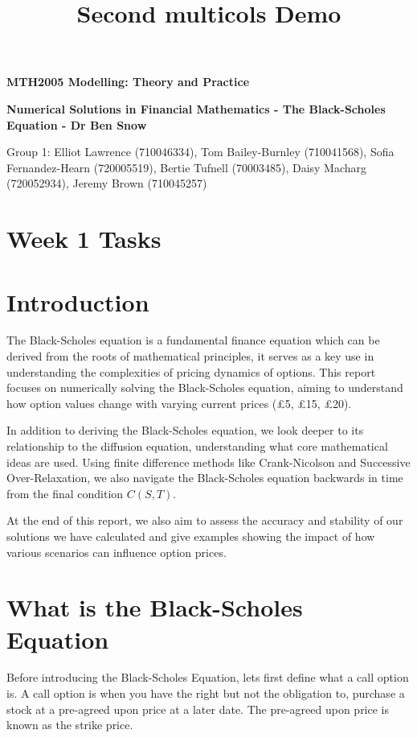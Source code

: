 \documentclass[11pt]{article}
\title{Second multicols Demo}
\begin{document}
{\large\bf MTH2005 Modelling: Theory and Practice }
 
\vspace{4mm} 

{\Large\bf Numerical Solutions in Financial Mathematics - The Black-Scholes Equation - Dr Ben Snow }

\vspace{1mm}

Group 1: Elliot Lawrence (710046334), Tom Bailey-Burnley (710041568), Sofia Fernandez-Hearn (720005519), Bertie Tufnell (70003485), Daisy Macharg (720052934), Jeremy Brown (710045257)

\vspace{3mm}

\section{Week 1 Tasks} %

\section{Introduction}

The Black-Scholes equation is a fundamental finance equation which can be derived from the roots of mathematical principles, it serves as a key use in understanding the complexities of pricing dynamics of options. This report focuses on numerically solving the Black-Scholes equation, aiming to understand how option values change with varying current prices (£5, £15, £20). 

In addition to deriving the Black-Scholes equation, we look deeper to its relationship to the diffusion equation, understanding what core mathematical ideas are used.  Using finite difference methods like Crank-Nicolson and Successive Over-Relaxation, we also navigate the Black-Scholes equation backwards in time from the final condition \(C(S, T)\).

At the end of this report, we also aim to assess the accuracy and stability of our solutions we have calculated and give examples showing the impact of how various scenarios can influence option prices.



\section{What is the Black-Scholes Equation}

Before introducing the Black-Scholes Equation, lets first define what a call option is. A call option is when you have the right but not the obligation to, purchase a stock at a pre-agreed upon price at a later date. The pre-agreed upon price is known as the strike price.
\end{document}
